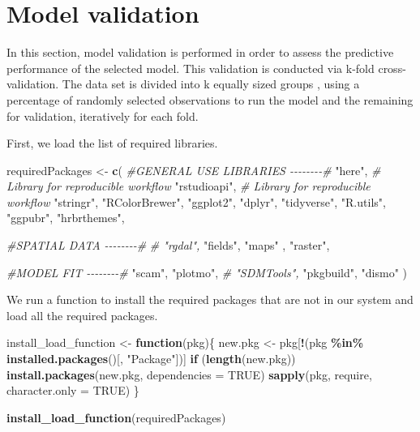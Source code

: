 \documentclass[
]{book}
\newenvironment{Shaded}{\begin{snugshade}}{\end{snugshade}}
\newcommand{\AttributeTok}[1]{\textcolor[rgb]{0.13,0.29,0.53}{#1}}
\newcommand{\CommentTok}[1]{\textcolor[rgb]{0.56,0.35,0.01}{\textit{#1}}}
\newcommand{\ConstantTok}[1]{\textcolor[rgb]{0.56,0.35,0.01}{#1}}
\newcommand{\ControlFlowTok}[1]{\textcolor[rgb]{0.13,0.29,0.53}{\textbf{#1}}}
\newcommand{\FunctionTok}[1]{\textcolor[rgb]{0.13,0.29,0.53}{\textbf{#1}}}
\newcommand{\NormalTok}[1]{#1}
\newcommand{\OtherTok}[1]{\textcolor[rgb]{0.56,0.35,0.01}{#1}}
\newcommand{\SpecialCharTok}[1]{\textcolor[rgb]{0.81,0.36,0.00}{\textbf{#1}}}
\newcommand{\StringTok}[1]{\textcolor[rgb]{0.31,0.60,0.02}{#1}}
\begin{document}
\chapter{Model validation}\label{model-validation}

In this section, model validation is performed in order to assess the predictive performance of the selected model. This validation is conducted via k-fold cross-validation. The data set is divided into k equally sized groups \citep{hijmans_2012}, using a percentage of randomly selected observations to run the model and the remaining for validation, iteratively for each fold.

First, we load the list of required libraries.

\begin{Shaded}
\begin{Highlighting}[]
\NormalTok{requiredPackages }\OtherTok{\textless{}{-}} \FunctionTok{c}\NormalTok{(}
  \CommentTok{\#GENERAL USE LIBRARIES {-}{-}{-}{-}{-}{-}{-}{-}\#}
  \StringTok{"here"}\NormalTok{, }\CommentTok{\# Library for reproducible workflow}
  \StringTok{"rstudioapi"}\NormalTok{,  }\CommentTok{\# Library for reproducible workflow}
  \StringTok{"stringr"}\NormalTok{,}
  \StringTok{"RColorBrewer"}\NormalTok{,  }
  \StringTok{"ggplot2"}\NormalTok{,}
  \StringTok{"dplyr"}\NormalTok{,}
  \StringTok{"tidyverse"}\NormalTok{,}
  \StringTok{"R.utils"}\NormalTok{,}
  \StringTok{"ggpubr"}\NormalTok{,}
  \StringTok{"hrbrthemes"}\NormalTok{,}
  
  \CommentTok{\#SPATIAL DATA {-}{-}{-}{-}{-}{-}{-}{-}\#}
  \CommentTok{\# "rgdal",}
  \StringTok{"fields"}\NormalTok{,}
  \StringTok{"maps"}\NormalTok{ ,}
  \StringTok{"raster"}\NormalTok{,}

  \CommentTok{\#MODEL FIT {-}{-}{-}{-}{-}{-}{-}{-}\#}
  \StringTok{"scam"}\NormalTok{,}
  \StringTok{"plotmo"}\NormalTok{,}
  \CommentTok{\# "SDMTools",}
  \StringTok{"pkgbuild"}\NormalTok{,}
  \StringTok{"dismo"}
\NormalTok{  )}
\end{Highlighting}
\end{Shaded}

We run a function to install the required packages that are not in our system and load all the required packages.

\begin{Shaded}
\begin{Highlighting}[]
\NormalTok{install\_load\_function }\OtherTok{\textless{}{-}} \ControlFlowTok{function}\NormalTok{(pkg)\{}
\NormalTok{  new.pkg }\OtherTok{\textless{}{-}}\NormalTok{ pkg[}\SpecialCharTok{!}\NormalTok{(pkg }\SpecialCharTok{\%in\%} \FunctionTok{installed.packages}\NormalTok{()[, }\StringTok{"Package"}\NormalTok{])]}
  \ControlFlowTok{if}\NormalTok{ (}\FunctionTok{length}\NormalTok{(new.pkg))}
    \FunctionTok{install.packages}\NormalTok{(new.pkg, }\AttributeTok{dependencies =} \ConstantTok{TRUE}\NormalTok{)}
  \FunctionTok{sapply}\NormalTok{(pkg, require, }\AttributeTok{character.only =} \ConstantTok{TRUE}\NormalTok{)}
\NormalTok{\}}

\FunctionTok{install\_load\_function}\NormalTok{(requiredPackages)}
\end{Highlighting}
\end{Shaded}
\end{document}
